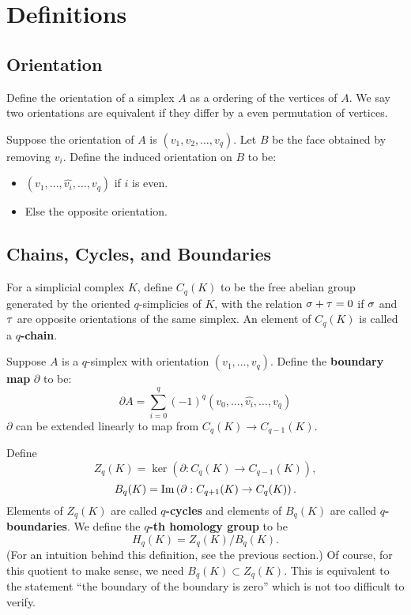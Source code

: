 \section{Definitions}

\subsection{Orientation}

Define the orientation of a simplex $A$ as a ordering of the vertices of $A$. We say two orientations are equivalent if they differ by a even permutation of vertices.

Suppose the orientation of $A$ is $(v_1, v_2, \dots, v_q)$. Let $B$ be the face obtained by removing $v_i$. Define the induced orientation on $B$ to be:
\begin{itemize}
    \item $(v_1, \dots, \hat{v_i}, \dots, v_q)$ if $i$ is even.
    \item Else the opposite orientation.
\end{itemize}

\subsection{Chains, Cycles, and Boundaries}

For a simplicial complex $K$, define $C_q(K)$ to be the free abelian group generated by the oriented $q$-simplicies of $K$, with the relation $\sigma + \tau = 0$ if $\sigma$ and $\tau$ are opposite orientations of the same simplex. An element of $C_q(K)$ is called a \textbf{$q$-chain}.

Suppose $A$ is a $q$-simplex with orientation $(v_1, \dots, v_q)$. Define the \textbf{boundary map} $\partial$ to be:
\[
    \partial A = \sum_{i = 0}^q(-1)^q (v_0, \dots, \hat{v_i}, \dots, v_q)
\]
$\partial$ can be extended linearly to map from $C_q(K) \to C_{q-1}(K)$.

Define
\[
    Z_q(K) = \ker\left(\partial: C_q(K) \to C_{q-1}(K)\right),
\]
\[
    B_q(K) = \operatorname{Im}\left(\partial: C_{q+1}(K) \to C_q(K)\right).
\]
Elements of $Z_q(K)$ are called \textbf{$q$-cycles} and elements of $B_q(K)$ are called \textbf{$q$-boundaries}. We define the \textbf{$q$-th homology group} to be
\[
    H_q(K) = Z_q(K) / B_q(K).
\]
(For an intuition behind this definition, see the previous section.) Of course, for this quotient to make sense, we need $B_q(K) \subset Z_q(K)$. This is equivalent to the statement ``the boundary of the boundary is zero'' which is not too difficult to verify.

